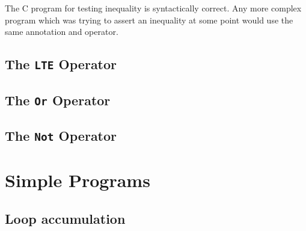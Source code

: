         The C program for testing inequality is syntactically correct. Any more complex program which was trying to assert an inequality at some point would use the same annotation and operator.
        
        
        
        
        
        
    
        
        
        
        
    
    \subsection{The \texttt{LTE} Operator}
    
    \subsection{The \texttt{Or} Operator}\label{evaln:ops:or}
        
    
        
    
        
        
        
    
    \subsection{The \texttt{Not} Operator}\label{evaln:ops:not}
        
        
        

\section{Simple Programs}\label{evaln:progs}
    \subsection{Loop accumulation}
